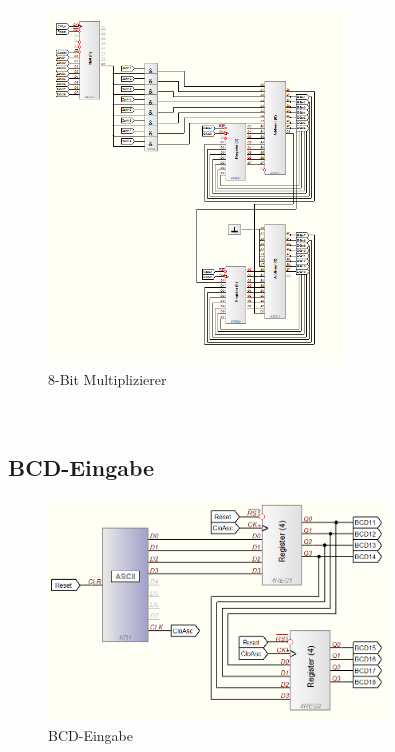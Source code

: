 \documentclass[a4paper,12pt,fleqn,oneside]{article}
\begin{document}
		\begin{figure}[h]
			\center
			\includegraphics[width=0.7\textwidth]{multiplizierer}
			\caption{8-Bit Multiplizierer}
			\label{fig:Multiplizierer}
		\end{figure}
		\FloatBarrier

\newpage
	$  $
	\FloatBarrier

\newpage
	\subsection{BCD-Eingabe}
		\begin{figure}[h]
			\center
			\includegraphics[width=0.8\textwidth]{bcd_eingabe}
			\caption{BCD-Eingabe}
			\label{fig:bcd_eingabe}
		\end{figure}
		\FloatBarrier
		
\end{document}

